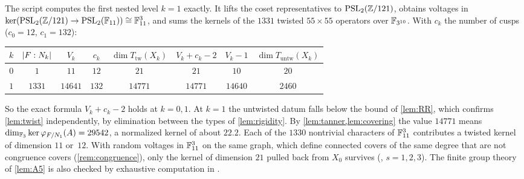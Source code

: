 \begin{remark}[Numerical]\label{rem:numerics}
The script  computes the first nested level $k=1$ exactly. It lifts the coset
representatives to $\operatorname{PSL}_2(\mathbb{Z}/121)$, obtains voltages in $\ker(\operatorname{PSL}_2(\mathbb{Z}/121)\to\operatorname{PSL}_2(\mathbb{F}_{11}))\cong\mathbb{F}_{11}^3$, and sums the
kernels of the $1331$ twisted $55\times55$ operators over $\mathbb{F}_{3^{10}}$. With $c_k$ the number of cusps
($c_0=12$, $c_1=132$):
\begin{center}
\begin{tabular}{@{}cccccccc@{}}
\toprule
$k$ & $\lvert F:N_k \rvert$ & $V_k$ & $c_k$ & $\dim T_{\mathrm{tw}}(X_k)$ & $V_k+c_k-2$ & $V_k-1$ & $\dim T_{\mathrm{untw}}(X_k)$\\
\midrule
$0$ & $1$ & $11$ & $12$ & $21$ & $21$ & $10$ & $20$\\
$1$ & $1331$ & $14641$ & $132$ & $14771$ & $14771$ & $14640$ & $2460$\\
\bottomrule
\end{tabular}
\end{center}
So the exact formula $V_k+c_k-2$ holds at $k=0,1$. At $k=1$ the untwisted datum falls below the bound of \cref{lem:RR},
which confirms \cref{lem:twist} independently, by elimination between the types of \cref{lem:rigidity}. By
\cref{lem:tanner,lem:covering} the value $14771$ means $\dim_{\mathbb{F}_3}\ker\varphi_{F/N_1}(A)=29542$, a normalized kernel of
about $22.2$. Each of the $1330$ nontrivial characters of $\mathbb{F}_{11}^3$ contributes a twisted kernel of dimension $11$ or~$12$.
With random voltages in $\mathbb{F}_{11}^3$ on the same graph, which define connected covers of the same degree that are not
congruence covers (\cref{rem:congruence}), only the kernel of dimension $21$ pulled back from $X_0$ survives
(, $s=1,2,3$). The finite group theory of \cref{lem:A5} is also checked by
exhaustive computation in .
\end{remark}
